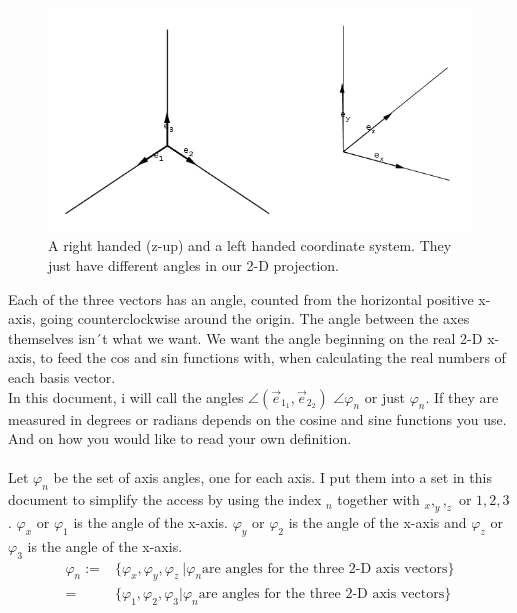 \documentclass[a4paper]{article}
\begin{document}
\begin{figure}[ht]
\label{handsystems}
\includegraphics{handsystems.png}
\caption{A right handed (z-up) and a left handed coordinate system. They just have different angles in our 2-D projection.}
\end{figure}

Each of the three vectors has an angle, counted from the horizontal positive x-axis, going counterclockwise around the origin. The
angle between the axes themselves isn´t what we want. We want the angle beginning on the real 2-D x-axis, to feed the cos and sin functions with, when calculating the real numbers of each basis vector.\\

In this document, i will call the angles $\angle(\vec{e}_{1}_{1},\vec{e}_{2}_{2})$ $\angle\varphi_{n}$ or just $\varphi_{n}$. If they are measured in degrees or radians depends on the cosine and sine functions you use. And on how you would like to read your own definition.\\

\\


Let $\varphi_{n}$ be the set of axis angles, one for each axis. I put them into a set in this document to simplify the access by
using the index $_{n}$ together with $_x, _y, _z$ or $1,2,3$. $\varphi_x$ or $\varphi_1$ is the angle of the x-axis. $\varphi_y$ or $\varphi_2$ is the angle of the x-axis and $\varphi_z$ or $\varphi_3$ is the angle of the x-axis. \\

\begin{displaymath}
\begin{align}
\varphi_{n} :=& \{\varphi_x, \varphi_y, \varphi_z\ | \varphi_n \mbox{are angles for the three 2-D axis vectors}\}\\
 =& \{ \varphi_1, \varphi_2, \varphi_3 | \varphi_n \mbox{are angles for the three 2-D axis vectors} \}
\end{align}
\end{displaymath}
\end{document}
